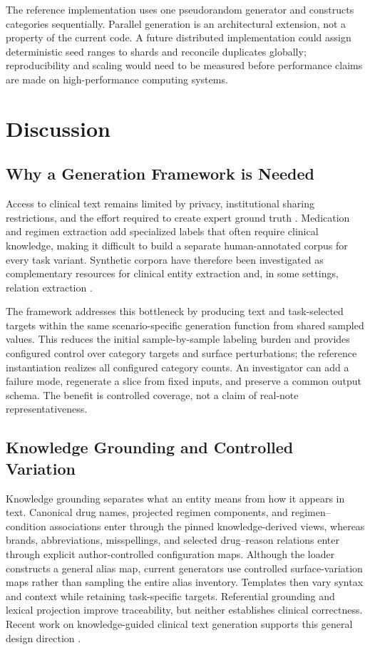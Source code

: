 \documentclass[conference]{IEEEtran}
\begin{document}
The reference implementation uses one pseudorandom generator and constructs
categories sequentially. Parallel generation is an architectural extension,
not a property of the current code. A future distributed implementation could
assign deterministic seed ranges to shards and reconcile duplicates globally;
reproducibility and scaling would need to be measured before performance claims
are made on high-performance computing systems.

\section{Discussion}
\label{sec:discussion}

\subsection{Why a Generation Framework is Needed}

Access to clinical text remains limited by privacy, institutional sharing
restrictions, and the effort required to create expert ground truth
\cite{chapman2011,uzuner2010annotation}. Medication and regimen extraction add
specialized labels that often require clinical knowledge, making it difficult
to build a separate human-annotated corpus for every task variant. Synthetic
corpora have therefore been investigated as complementary resources for
clinical entity extraction and, in some settings, relation extraction
\cite{brekke2021,li2021}.

The framework addresses this bottleneck by producing text and task-selected
targets within the same scenario-specific generation function from shared
sampled values. This reduces the initial sample-by-sample labeling burden and
provides configured control over category
targets and surface perturbations; the reference instantiation realizes all
configured category counts. An investigator can add a failure mode, regenerate
a slice from fixed inputs, and preserve a common output schema. The benefit is
controlled coverage, not a claim of real-note representativeness.

\subsection{Knowledge Grounding and Controlled Variation}

Knowledge grounding separates what an entity means from how it appears in text.
Canonical drug names, projected regimen components, and regimen--condition
associations enter through the pinned knowledge-derived views, whereas brands,
abbreviations, misspellings, and selected drug--reason relations enter through
explicit author-controlled configuration maps. Although the loader constructs
a general alias map, current generators use controlled surface-variation maps
rather than sampling the entire alias inventory. Templates then vary syntax
and context while retaining task-specific targets. Referential grounding and
lexical projection improve traceability, but neither establishes clinical
correctness. Recent work on knowledge-guided clinical text generation supports
this general design direction \cite{xu2024}.
\end{document}
